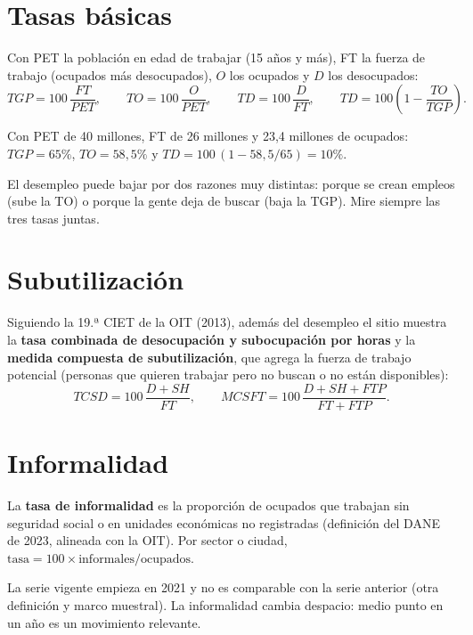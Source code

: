 \section{Tasas básicas}
Con PET la población en edad de trabajar (15 años y más), FT la fuerza de trabajo (ocupados más desocupados),
$O$ los ocupados y $D$ los desocupados:
\[
TGP=100\,\frac{FT}{PET},\qquad TO=100\,\frac{O}{PET},\qquad TD=100\,\frac{D}{FT},\qquad
TD=100\left(1-\frac{TO}{TGP}\right).
\]

\begin{dato}
Con PET de 40 millones, FT de 26 millones y 23,4 millones de ocupados: $TGP=65\%$, $TO=58{,}5\%$ y
$TD=100\,(1-58{,}5/65)=10\%$.
\end{dato}

\begin{leer}
El desempleo puede bajar por dos razones muy distintas: porque se crean empleos (sube la TO) o porque la gente deja
de buscar (baja la TGP). Mire siempre las tres tasas juntas.
\end{leer}

\section{Subutilización}
Siguiendo la 19.ª CIET de la OIT (2013), además del desempleo el sitio muestra la \textbf{tasa combinada de
desocupación y subocupación por horas} y la \textbf{medida compuesta de subutilización}, que agrega la fuerza de
trabajo potencial (personas que quieren trabajar pero no buscan o no están disponibles):
\[
TCSD=100\,\frac{D+SH}{FT},\qquad MCSFT=100\,\frac{D+SH+FTP}{FT+FTP}.
\]

\section{Informalidad}
La \textbf{tasa de informalidad} es la proporción de ocupados que trabajan sin seguridad social o en unidades
económicas no registradas (definición del DANE de 2023, alineada con la OIT). Por sector o ciudad,
$\text{tasa}=100\times\text{informales}/\text{ocupados}$.

\begin{alerta}
La serie vigente empieza en 2021 y no es comparable con la serie anterior (otra definición y marco muestral). La
informalidad cambia despacio: medio punto en un año es un movimiento relevante.
\end{alerta}

